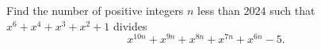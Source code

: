Find the number of positive integers $n$ less than $2024$ such that $x^6 +x^4 +x^3 +x^2 +1$ divides \[x^{10n} + x^{9n} + x^{8n} + x^{7n} + x^{6n} - 5.\]
